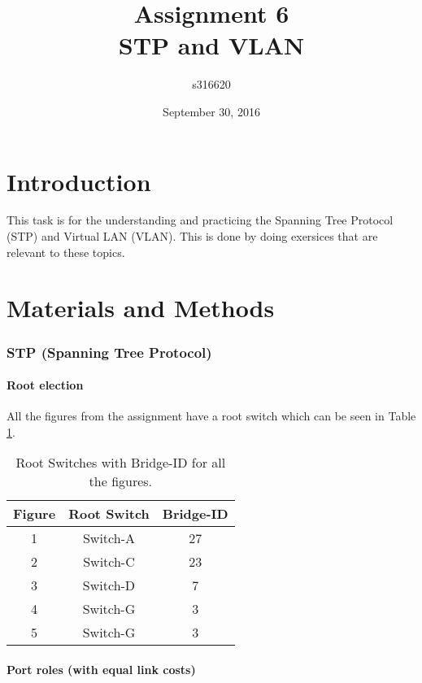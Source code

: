 \documentclass{article}
\title{\textbf{Assignment 6}\\ STP and VLAN}
\author{s316620}
\date{September 30, 2016}
\begin{document}
\maketitle
\newpage

\part*{Introduction}
This task is for the understanding and practicing the Spanning Tree Protocol (STP) and Virtual LAN (VLAN). This is done by doing exersices that are relevant to these topics.

\part*{Materials and Methods}

\section{STP (Spanning Tree Protocol)}

\subsection{Root election}

All the figures from the assignment have a root switch which can be seen in Table \ref{tab:Root_switches}.

\begin{table}[!h]
 \centering
    \begin{tabular}{|c|c|c|}
        \hline
        Figure & Root Switch & Bridge-ID \\ \hline
        1      & Switch-A    & 27        \\ 
        2      & Switch-C    & 23        \\ 
        3      & Switch-D    & 7         \\ 
        4      & Switch-G    & 3         \\ 
        5      & Switch-G    & 3         \\
        \hline
    \end{tabular}
     \caption{Root Switches with Bridge-ID for all the figures.}
    \label{tab:Root_switches}
\end{table}

\subsection{Port roles (with equal link costs)}
\end{document}
